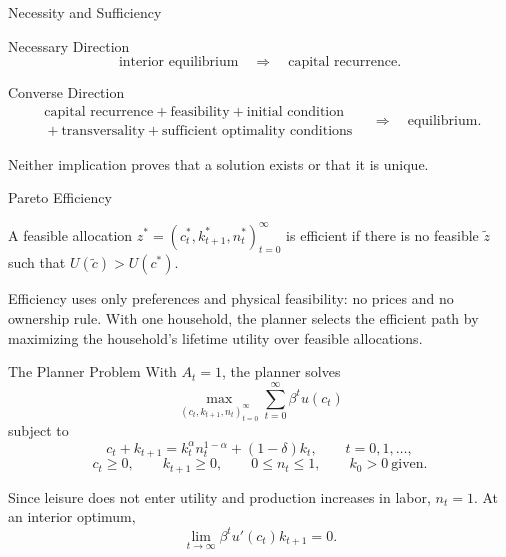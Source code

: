 \documentclass[11pt,aspectratio=169,c]{beamer}
\begin{document}
\begin{frame}{Necessity and Sufficiency}
  \begin{block}{Necessary Direction}
    \[
      \text{interior equilibrium}
      \quad\Longrightarrow\quad
      \text{capital recurrence}.
    \]
  \end{block}

  \begin{block}{Converse Direction}
    \[
      \begin{gathered}
        \text{capital recurrence}+\text{feasibility}+\text{initial condition}\\
        {}+\text{transversality}+\text{sufficient optimality conditions}
      \end{gathered}
      \quad\Longrightarrow\quad
      \text{equilibrium}.
    \]
  \end{block}

  \vspace{.30em}
  \centering
  Neither implication proves that a solution exists or that it is unique.
\end{frame}

\begin{frame}{Pareto Efficiency}
  \begin{definitionbox}[Efficiency]
    A feasible allocation
    $z^*=\left(c_t^*,k_{t+1}^*,n_t^*\right)_{t=0}^{\infty}$ is efficient if
    there is no feasible $\widetilde z$ such that
    $U(\widetilde c)>U(c^*)$.
  \end{definitionbox}

  Efficiency uses only preferences and physical feasibility: no prices and no
  ownership rule. With one household, the planner selects the efficient path by
  maximizing the household's lifetime utility over feasible allocations.
\end{frame}

\begin{frame}{The Planner Problem}
  With $A_t=1$, the planner solves
  \[
    \max_{\left(c_t,k_{t+1},n_t\right)_{t=0}^{\infty}}
    \sum_{t=0}^{\infty}\beta^t u(c_t)
  \]
  subject to
  \[
    c_t+k_{t+1}
    =
    k_t^\alpha n_t^{1-\alpha}+(1-\delta)k_t,
    \qquad t=0,1,\ldots,
  \]
  \[
    c_t\geq0,
    \qquad
    k_{t+1}\geq0,
    \qquad
    0\leq n_t\leq1,
    \qquad
    k_0>0\ \text{given}.
  \]

  Since leisure does not enter utility and production increases in labor,
  $n_t=1$. At an interior optimum,
  \[
    \lim_{t\to\infty}\beta^t u'(c_t)k_{t+1}=0.
  \]
\end{frame}
\end{document}
